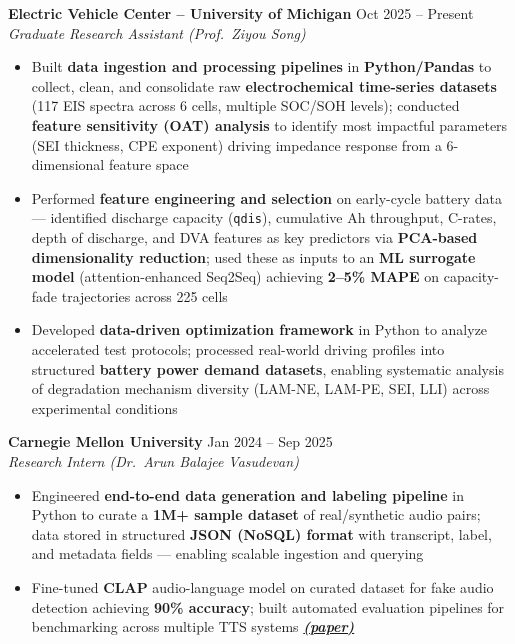 \documentclass[8.2pt]{article}
\begin{document}
\textbf{Electric Vehicle Center -- University of Michigan} \hfill Oct 2025 -- Present\\
\emph{Graduate Research Assistant (Prof.\ Ziyou Song)}\\
\vspace{-6mm}
\begin{itemize}[leftmargin=*,noitemsep,topsep=1pt]
  \item Built \textbf{data ingestion and processing pipelines} in \textbf{Python/Pandas} to collect, clean, and consolidate raw \textbf{electrochemical time-series datasets} (117 EIS spectra across 6 cells, multiple SOC/SOH levels); conducted \textbf{feature sensitivity (OAT) analysis} to identify most impactful parameters (SEI thickness, CPE exponent) driving impedance response from a 6-dimensional feature space
  \item Performed \textbf{feature engineering and selection} on early-cycle battery data --- identified discharge capacity (\texttt{qdis}), cumulative Ah throughput, C-rates, depth of discharge, and DVA features as key predictors via \textbf{PCA-based dimensionality reduction}; used these as inputs to an \textbf{ML surrogate model} (attention-enhanced Seq2Seq) achieving \textbf{2--5\% MAPE} on capacity-fade trajectories across 225 cells
  \item Developed \textbf{data-driven optimization framework} in Python to analyze accelerated test protocols; processed real-world driving profiles into structured \textbf{battery power demand datasets}, enabling systematic analysis of degradation mechanism diversity (LAM-NE, LAM-PE, SEI, LLI) across experimental conditions
\end{itemize}

\vspace{-2mm}
\textbf{Carnegie Mellon University} \hfill Jan 2024 -- Sep 2025\\
\emph{Research Intern (Dr.\ Arun Balajee Vasudevan)}\\
\vspace{-6mm}
\begin{itemize}[leftmargin=*,noitemsep,topsep=1pt]
  \item Engineered \textbf{end-to-end data generation and labeling pipeline} in Python to curate a \textbf{1M+ sample dataset} of real/synthetic audio pairs; data stored in structured \textbf{JSON (NoSQL) format} with transcript, label, and metadata fields --- enabling scalable ingestion and querying
  \item Fine-tuned \textbf{CLAP} audio-language model on curated dataset for fake audio detection achieving \textbf{90\% accuracy}; built automated evaluation pipelines for benchmarking across multiple TTS systems \emph{\textbf{\href{https://drive.google.com/file/d/1hdSPxQQA-PKayYQPPESZb11ofm7XrQRX/view?usp=sharing}{(paper)}}}
\end{itemize}
\end{document}
